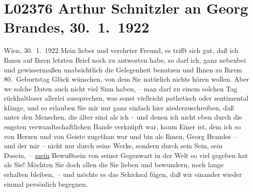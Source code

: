 

\section[Arthur Schnitzler an Georg Brandes, 30. 1. 1922]{L02376 Arthur Schnitzler an Georg Brandes, 30. 1. 1922}
\nopagebreak{}
\rehead{ }\normalsize\beginnumbering{}
\toendnotes[C]{\smallbreak\pagebreak[2]}
\toendnotes[C]{\smallbreak}
\pstart
           \raggedleft{}{\pb}Wien, 30. 1. 1922\pend
           \vspace{0.5em}
\pstart
           Mein lieber und verehrter Freund, es trifft sich gut, daß ich Ihnen
               auf Ihren letzten Brief noch zu antworten habe, so darf ich, ganz nebenbei und
               gewissermaßen unabsichtlich die Gelegenheit benutzen und Ihnen zu Ihrem
               80. Geburtstag Glück wünschen, von dem Sie natürlich nichts hören wollen. Aber we{\geminationn} solche Daten auch nicht viel Sinn haben, – man darf zu
               einem solchen Tag rückhaltloser  allerlei
               aussprechen, was sonst vielleicht pathetisch oder sentimental klänge, und so erlauben
               Sie mir nur ganz einfach hier niederzuschreiben, daß unter den Menschen, die älter
               sind als ich – und denen ich nicht eben durch die engsten verwandtschaftlichen Bande
               verknüpft war, kaum Einer ist, dem ich so von Herzen und von Geiste zugethan war und
               bin als Ihnen, Georg Brandes – und der mir – nicht nur durch seine Werke, sondern
               durch sein Sein, sein Dasein, – \uline{mein} Bewußtsein von
               seiner Gegenwart {\pb}in der Welt so viel gegeben hat
               als Sie! Möchten Sie doch allen die Sie lieben und bewundern, noch lange erhalten
               bleiben, – und möchte es das Schicksal fügen, daß wir einander wieder einmal
               persönlich begegnen.\pend
           
